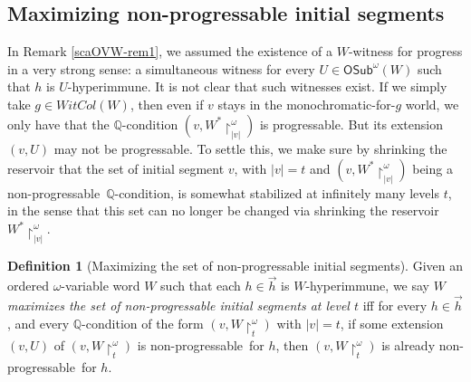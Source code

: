 \documentclass{article}
\def\uhr{\upharpoonright}
\def\nonprogressable{non-progressable}
\def\progressable{progressable}
\def\wc{WitCol}
\def\QQ{\mathbb{Q}}
\newcommand{\OSub}{\mathsf{OSub}}
\numberwithin{theorem}{section}
\theoremstyle{definition}
\newtheorem{definition}[theorem]{Definition}
\begin{document}
\subsection{Maximizing non-progressable initial segments}

In Remark \ref{scaOVW-rem1}, we assumed the existence of a $W$-witness for progress in a very strong sense:
a simultaneous witness for every $U \in \OSub^\omega(W)$ such that $h$ is $U$-hyperimmune. It is not clear that such witnesses exist. If we simply take $g \in \wc(W)$, then even if $v$ stays in the monochromatic-for-$g$ world,
we only have that the $\QQ$-condition $(v,W^*\uhr_{|v|}^\omega) $ is \progressable.
But
its extension $(v, U)$ may not be \progressable.
To settle this, we make sure by shrinking the reservoir that
the set of initial segment $v$, with $|v|=t$
and $(v,W^*\uhr_{|v|}^\omega)$ being a \nonprogressable\ $\QQ$-condition, is
somewhat stabilized at infinitely many levels $t$, in the sense
that this set can no longer be changed via shrinking the reservoir $W^*\uhr_{|v|}^\omega$.



\begin{definition}
[Maximizing the set of non-progressable initial segments]
Given an ordered $\omega$-variable word $W$
such that each $h\in\vec{h}$ is $W$-hyperimmune,
we say $W$ \emph{maximizes the set of non-progressable initial segments at level $t$} iff 
for every $h\in\vec{h}$, and every $\QQ$-condition of the form $(v,W\uhr_t^\omega)$ with $|v| = t$, 
if some extension $(v,U)$ of $(v,W\uhr_t^\omega)$
is \nonprogressable\ for $h $, then   $(v,W\uhr_t^\omega)$
is already \nonprogressable\ for
 $h $.

\end{definition}

\end{document}
